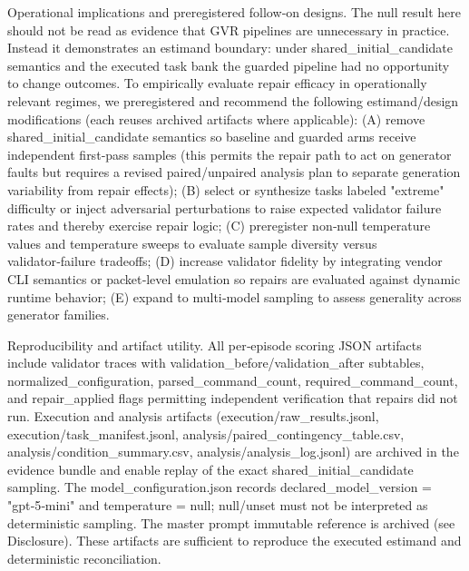 \documentclass[conference]{IEEEtran}
\begin{document}
Operational implications and preregistered follow‑on designs. The null result here should not be read as evidence that GVR pipelines are unnecessary in practice. Instead it demonstrates an estimand boundary: under shared\_initial\_candidate semantics and the executed task bank the guarded pipeline had no opportunity to change outcomes. To empirically evaluate repair efficacy in operationally relevant regimes, we preregistered and recommend the following estimand/design modifications (each reuses archived artifacts where applicable): (A) remove shared\_initial\_candidate semantics so baseline and guarded arms receive independent first‑pass samples (this permits the repair path to act on generator faults but requires a revised paired/unpaired analysis plan to separate generation variability from repair effects); (B) select or synthesize tasks labeled "extreme" difficulty or inject adversarial perturbations to raise expected validator failure rates and thereby exercise repair logic; (C) preregister non‑null temperature values and temperature sweeps to evaluate sample diversity versus validator‑failure tradeoffs; (D) increase validator fidelity by integrating vendor CLI semantics or packet‑level emulation so repairs are evaluated against dynamic runtime behavior; (E) expand to multi‑model sampling to assess generality across generator families.

Reproducibility and artifact utility. All per‑episode scoring JSON artifacts include validator traces with validation\_before/validation\_after subtables, normalized\_configuration, parsed\_command\_count, required\_command\_count, and repair\_applied flags permitting independent verification that repairs did not run. Execution and analysis artifacts (execution/raw\_results.jsonl, execution/task\_manifest.jsonl, analysis/paired\_contingency\_table.csv, analysis/condition\_summary.csv, analysis/analysis\_log.jsonl) are archived in the evidence bundle and enable replay of the exact shared\_initial\_candidate sampling. The model\_configuration.json records declared\_model\_version = "gpt‑5‑mini" and temperature = null; null/unset must not be interpreted as deterministic sampling. The master prompt immutable reference is archived (see Disclosure). These artifacts are sufficient to reproduce the executed estimand and deterministic reconciliation.
\end{document}

